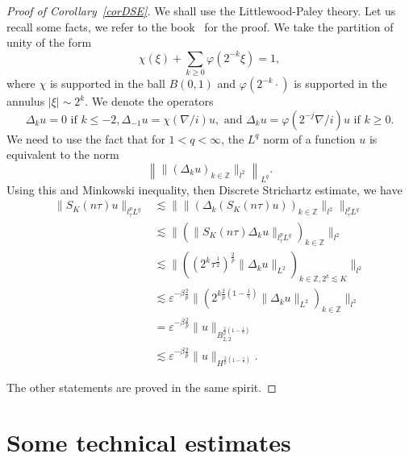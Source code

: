 \documentclass[10pt,a4paper]{article}
\begin{document}
  \begin{proof}[Proof of Corollary~\ref{corDSE}]
    We shall use the Littlewood-Paley theory. Let us recall some facts, we refer
    to the book~\cite{BCD11} for the proof. We take the partition of unity of
    the form 
    \[  \chi(\xi) + \sum_{k\geq0}\varphi(2^{-k}\xi) = 1 ,\]
    where \(\chi\) is supported in the ball \(B(0,1)\) and \(\varphi(2^{-k}\cdot)\) is
    supported in the annulus \(|\xi| \sim 2^k\). We denote the operators 
    \[ \Delta_k u = 0 \text{ if } k \leq -2, \Delta_{-1} u = \chi(\nabla/i) u,
    \text{ and } \Delta_k u = \varphi(2^{-j}\nabla/i) u \text{ if } k \geq 0.\]
    We need to use the fact that for \(1<q<\infty\), the \(L^q\) norm of a function
    \(u\) is equivalent to the norm 
    \[ \left\| \|(\Delta_k u)_{k\in \mathbb Z}\|_{l^2} \right\|_{L^q}. \]
    Using this and Minkowski inequality, then Discrete
    Strichartz estimate, we have
    \begin{equation}
      \begin{aligned}
        \|S_K(n\tau)u\|_{l^p_\tau L^q} & \lesssim \|\|(\Delta_k (S_K(n\tau) u))_{k\in \mathbb Z}\|_{l^2}\|_{l^p_\tau L^q} \\
        &\lesssim \|(\|S_K(n\tau) \Delta_k u\|_{l^p_\tau L^q})_{k\in \mathbb Z}\|_{l^2} \\
        &\lesssim \|((2^k\tau^\frac12)^\frac2p \|\Delta_k u\|_{L^2})_{k\in \mathbb Z, 2^k \lesssim K}\|_{l^2} \\
        &\lesssim \varepsilon^{-\beta\frac2p}\|(2^{k\frac2p(1-\frac1\gamma)} \|\Delta_k u\|_{L^2})_{k\in \mathbb Z}\|_{l^2} \\
        &= \varepsilon^{-\beta\frac2p}\|u\|_{B^{\frac2p(1-\frac1\gamma)}_{2,2}} \\
        &\lesssim
        \varepsilon^{-\beta\frac2p}\|u\|_{H^{\frac2p(1-\frac1\gamma)}}.
      \end{aligned}
    \end{equation}

    The other statements are proved in the same spirit.
  \end{proof}


  \section{Some technical estimates}
\end{document}
